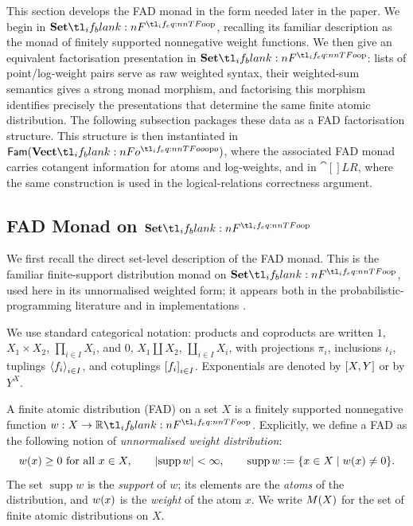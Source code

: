 \documentclass[11pt,a4paper]{article}
\theoremstyle{definition}
\theoremstyle{remark}
\providecommand{\Fam}[1]{\mathsf{Fam}(#1)}
\providecommand{\supp}{\operatorname{supp}}
\begin{document}
This section develops the FAD monad in the form needed later in the paper. We
begin in \( \Set \), recalling its familiar description as the monad of
finitely supported nonnegative weight functions. We then give an equivalent
factorisation presentation in \( \Set \): lists of point/log-weight pairs serve
as raw weighted syntax, their weighted-sum semantics gives a strong monad
morphism, and factorising this morphism identifies precisely the presentations
that determine the same finite atomic distribution. The following subsection packages these data as a FAD factorisation
structure. This structure is then instantiated in \( \Fam{\Vect[o]} \), where
the associated FAD monad carries cotangent information for atoms and
log-weights, and in \( \cat[]{LR} \), where the same construction is used in
the logical-relations correctness argument.

\subsection{FAD Monad on \texorpdfstring{\( \Set \)}{Set}}
\label{sec:fad-monad-on-set}

We first recall the direct set-level description of the FAD monad. This is the
familiar finite-support distribution monad on \( \Set \), used here in its
unnormalised weighted form; it appears both in the probabilistic-programming
literature \cite{erwigProbabilisticFunctionalProgramming2006} and in
implementations \cite{erwigProbabilisticFunctionalProgramming2025}.

We use standard categorical notation: products and coproducts are written
\(1\), \(X_1\times X_2\), \( \prod_{i\in I}X_i \), and
\(0\), \(X_1\amalg X_2\), \( \coprod_{i\in I}X_i \), with projections
\(\pi_i\), inclusions \(\iota_i\), tuplings \( \left\langle f_i\right\rangle_{i\in I} \), and
cotuplings \( \left[ f_i\right]_{i\in I} \). Exponentials are denoted by
\( \left[X,Y\right] \) or by \( Y^{X} \).

A finite atomic distribution (FAD) on a set \(X\) is a finitely supported
nonnegative function \(w:X\to\R\). Explicitly, we define a FAD as the following notion of \emph{unnormalised weight distribution}:
\[
\fn[n]{w}{x}\geq 0 \ \text{for all }x\in X,
\qquad
\abs{\supp w}<\infty,
\qquad
\supp w:=\{x\in X\mid \fn[n]{w}{x}\neq 0\}.
\]
The set \( \supp w \) is the \emph{support} of \(w\); its elements are the
\emph{atoms} of the distribution, and \( \fn[n]{w}{x} \) is the
\emph{weight} of the atom \(x\). We write \( \Fun[nn]{M}{X} \) for the set of
finite atomic distributions on \(X\).
\end{document}
